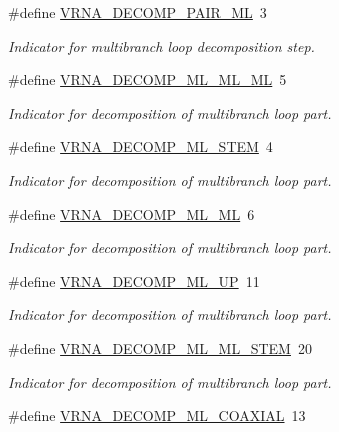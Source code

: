 \begin{DoxyCompactItemize}
\#define \hyperlink{group__constraints_gaa15b1185673f0b9e900c4748d45f388f}{V\+R\+N\+A\+\_\+\+D\+E\+C\+O\+M\+P\+\_\+\+P\+A\+I\+R\+\_\+\+ML}~3
\begin{DoxyCompactList}\small\item\em Indicator for multibranch loop decomposition step. \end{DoxyCompactList}\item 
\#define \hyperlink{group__constraints_ga735517266f2e35e1374b8f1ea77ef23e}{V\+R\+N\+A\+\_\+\+D\+E\+C\+O\+M\+P\+\_\+\+M\+L\+\_\+\+M\+L\+\_\+\+ML}~5
\begin{DoxyCompactList}\small\item\em Indicator for decomposition of multibranch loop part. \end{DoxyCompactList}\item 
\#define \hyperlink{group__constraints_ga4a23054c75d8efc785de50e3ea87602f}{V\+R\+N\+A\+\_\+\+D\+E\+C\+O\+M\+P\+\_\+\+M\+L\+\_\+\+S\+T\+EM}~4
\begin{DoxyCompactList}\small\item\em Indicator for decomposition of multibranch loop part. \end{DoxyCompactList}\item 
\#define \hyperlink{group__constraints_ga7f4cb9ff7a33e67f0539bd39e7b19a78}{V\+R\+N\+A\+\_\+\+D\+E\+C\+O\+M\+P\+\_\+\+M\+L\+\_\+\+ML}~6
\begin{DoxyCompactList}\small\item\em Indicator for decomposition of multibranch loop part. \end{DoxyCompactList}\item 
\#define \hyperlink{group__constraints_gae6478dda14e50e2f2cb9ef333a29256e}{V\+R\+N\+A\+\_\+\+D\+E\+C\+O\+M\+P\+\_\+\+M\+L\+\_\+\+UP}~11
\begin{DoxyCompactList}\small\item\em Indicator for decomposition of multibranch loop part. \end{DoxyCompactList}\item 
\#define \hyperlink{group__constraints_ga63d8ceb8c96ae3b463e529e28cc0fe98}{V\+R\+N\+A\+\_\+\+D\+E\+C\+O\+M\+P\+\_\+\+M\+L\+\_\+\+M\+L\+\_\+\+S\+T\+EM}~20
\begin{DoxyCompactList}\small\item\em Indicator for decomposition of multibranch loop part. \end{DoxyCompactList}\item 
\#define \hyperlink{group__constraints_ga4fe48d575830b16c208e280e01ab1497}{V\+R\+N\+A\+\_\+\+D\+E\+C\+O\+M\+P\+\_\+\+M\+L\+\_\+\+C\+O\+A\+X\+I\+AL}~13

\end{DoxyCompactItemize}
